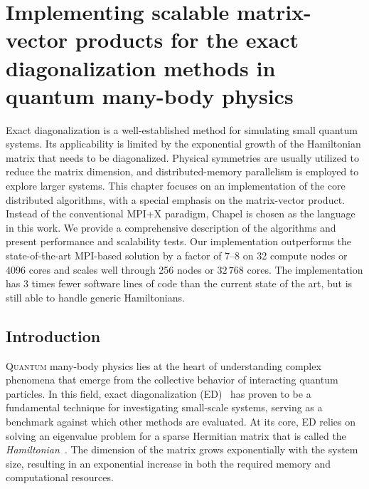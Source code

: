 \cleartoverso
\thispagestyle{empty}%
\BgThisPage
\clearpage
\chapter[Implementing scalable matrix-vector products for the exact diagonalization methods in quantum many-body physics][Scalable matrix-vector products for exact diagonalization]{Implementing scalable matrix-vector products for the exact diagonalization methods in quantum many-body physics}\label{ch:paw-atm}
\BgThisPage

{\small Exact diagonalization is a well-established method for simulating small quantum systems. Its applicability is limited by the exponential growth of the Hamiltonian matrix that needs to be diagonalized. Physical symmetries are usually utilized to reduce the matrix dimension, and distributed-memory parallelism is employed to explore larger systems. This chapter focuses on an implementation of the core distributed algorithms, with a special emphasis on the matrix-vector product. Instead of the conventional MPI+X paradigm, Chapel is chosen as the language in this work. We provide a comprehensive description of the algorithms and present performance and scalability tests. Our implementation outperforms the state-of-the-art MPI-based solution by a factor of 7--8 on 32 compute nodes or 4096 cores and scales well through 256 nodes or $32\,768$ cores. The implementation has 3 times fewer software lines of code than the current state of the art, but is still able to handle generic Hamiltonians.}
 
\clearpage

\section{Introduction}

\lettrine[lines=2]{Q}{uantum} many-body physics lies at the heart of understanding complex phenomena that emerge from the collective behavior of interacting quantum particles. In this field, exact diagonalization (ED)~\cite{LinH1990ExactDiagonali} has proven to be a fundamental technique for investigating small-scale systems, serving as a benchmark against which other methods are evaluated. At its core, ED relies on solving an eigenvalue problem for a sparse Hermitian matrix that is called the \emph{Hamiltonian}~\cite{Griffi2018IntroductionTo}. The dimension of the matrix grows exponentially with the system size, resulting in an exponential increase in both the required memory and computational resources.

